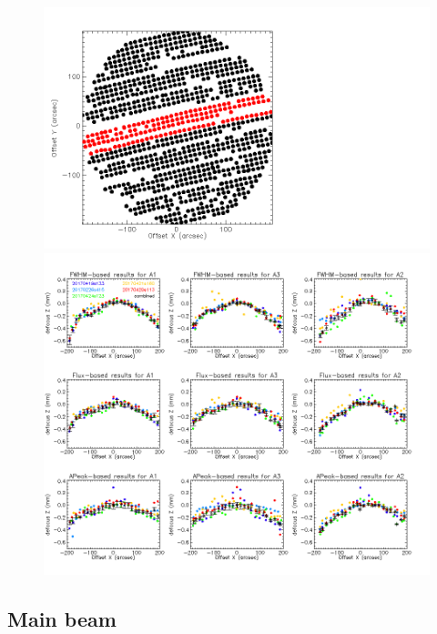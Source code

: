 \begin{figure}  
  \includegraphics[trim={-2cm, 2cm, 0, 2cm}, clip, angle=0, scale=0.1]{Figures/fov_focus_stability_check_D2.png}
  \begin{center}
  \includegraphics[trim={0, 2cm, 0, 2cm},clip, angle=0, scale=0.5]{Figures/fov_focus_1D_Hband_5.png}
\caption{}
\label{fig:focus-stability-V}
\end{center}
\end{figure}



\subsection{Main beam}


